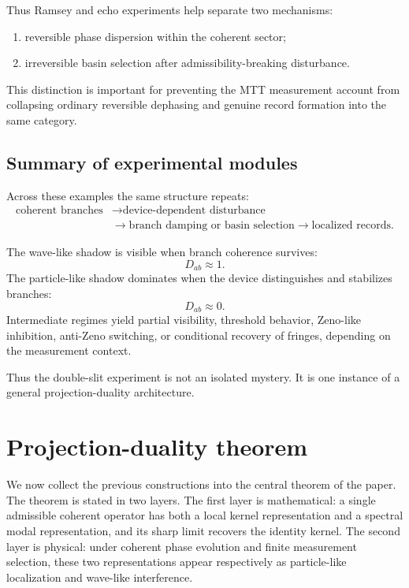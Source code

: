 \documentclass[11pt]{article}
\begin{document}
Thus Ramsey and echo experiments help separate two mechanisms:
\begin{enumerate}[label=(\roman*)]
  \item reversible phase dispersion within the coherent sector;
  \item irreversible basin selection after admissibility-breaking disturbance.
\end{enumerate}
This distinction is important for preventing the MTT measurement account from collapsing
ordinary reversible dephasing and genuine record formation into the same category.

\subsection{Summary of experimental modules}
\label{subsec:experiment-modules-summary}

Across these examples the same structure repeats:
\begin{equation}
  \begin{aligned}
  \text{coherent branches}
  &\longrightarrow \text{device-dependent disturbance}\\
  &\longrightarrow \text{branch damping or basin selection}
  \longrightarrow \text{localized records}.
  \end{aligned}
\end{equation}

The wave-like shadow is visible when branch coherence survives:
\begin{equation}
  D_{ab}\approx1.
\end{equation}
The particle-like shadow dominates when the device distinguishes and stabilizes branches:
\begin{equation}
  D_{ab}\approx0.
\end{equation}
Intermediate regimes yield partial visibility, threshold behavior, Zeno-like inhibition,
anti-Zeno switching, or conditional recovery of fringes, depending on the measurement
context.

Thus the double-slit experiment is not an isolated mystery. It is one instance of a general
projection-duality architecture.


\section{Projection-duality theorem}
\label{sec:projection-duality-theorem}

We now collect the previous constructions into the central theorem of the paper. The theorem
is stated in two layers. The first layer is mathematical: a single admissible coherent operator
has both a local kernel representation and a spectral modal representation, and its sharp
limit recovers the identity kernel. The second layer is physical: under coherent phase
evolution and finite measurement selection, these two representations appear respectively as
particle-like localization and wave-like interference.
\end{document}
